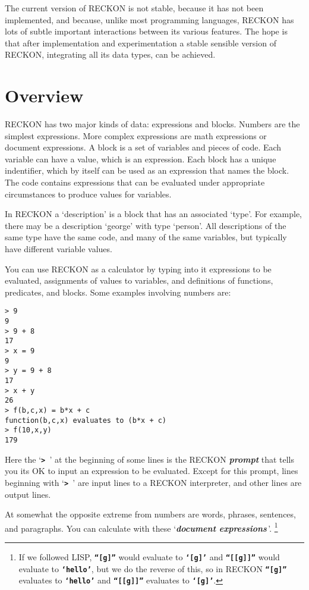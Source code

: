 \documentclass[12pt]{article}
\newcommand{\TT}[1]{{\tt \bfseries #1}}
\newcommand{\key}[1]{{\bf \em #1}\index{#1}}
\newcommand{\skey}[2]{{\bf \em #1#2}\index{#1}}
\newenvironment{indpar}[1][0.3in]%
	{\begin{list}{}%
		     {\setlength{\itemsep}{0in}%
		      \setlength{\topsep}{0in}%
		      \setlength{\parsep}{1ex}%
		      \setlength{\labelwidth}{#1}%
		      \setlength{\leftmargin}{#1}%
		      \addtolength{\leftmargin}{\labelsep}}%
	 \item}%
	{\end{list}}
\begin{document}
The current version of RECKON is not stable, because it has not been
implemented, and because, unlike most programming languages, RECKON
has lots of subtle important interactions between its various features.  The
hope is that after implementation and experimentation a stable sensible
version of RECKON, integrating all its data types, can be achieved.

\section{Overview}

RECKON has two major kinds of data: expressions and blocks.  Numbers are
the simplest expressions.  More complex expressions are math
expressions or document expressions.  A block is a set of variables
and pieces of code.  Each variable can have a value, which is an expression.
Each block has a unique indentifier, which by itself can be used as
an expression that names the block.
The code contains expressions that can be evaluated under appropriate
circumstances to produce values for variables.

In RECKON a `description' is a block that has an associated `type'.  For
example, there may be a description `george' with type `person'.  All
descriptions of the same type have the same code,
and many of the same variables,
but typically have different variable values.

You can use RECKON as a calculator by typing into it expressions to
be evaluated, assignments of values to variables, and definitions
of functions, predicates, and blocks.  Some examples involving numbers are:

\begin{indpar}\begin{verbatim}
> 9
9
> 9 + 8
17
> x = 9
9
> y = 9 + 8
17
> x + y
26
> f(b,c,x) = b*x + c
function(b,c,x) evaluates to (b*x + c)
> f(10,x,y)
179
\end{verbatim}\end{indpar}

Here the `\TT{>~}' at the beginning of some lines is the RECKON \key{prompt}
that tells you its OK to input an expression to be evaluated.
Except for this prompt, lines beginning with `\TT{> }' are input lines to
a RECKON interpreter, and other lines are output lines.

At somewhat the opposite extreme from numbers are words, phrases, sentences,
and paragraphs.  You can calculate with these `\skey{document expression}s\,'.%
\footnote{If we followed LISP, \TT{``[g]''} would evaluate to \TT{`[g]'}
and \TT{``[[g]]''} would evaluate to \TT{`hello'}, but we do the
reverse of this, so in RECKON \TT{``[g]''} evaluates to \TT{`hello'}
and \TT{``[[g]]''} evaluates to \TT{`[g]'}.}
\end{document}
